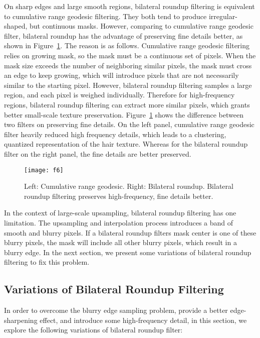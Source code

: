 On sharp edges and large smooth regions, bilateral roundup filtering is equivalent to cumulative range geodesic filtering. They both tend to produce irregular-shaped, but continuous masks. However, comparing to cumulative range geodesic filter, bilateral roundup has the advantage of preserving fine details better, as shown in Figure~\ref{fig:comparisonBetweenTwoFilters}. The reason is as follows. Cumulative range geodesic filtering relies on growing mask, so the mask must be a continuous set of pixels. When the mask size exceeds the number of neighboring similar pixels, the mask must cross an edge to keep growing, which will introduce pixels that are not necessarily similar to the starting pixel. However, bilateral roundup filtering samples a large region, and each pixel is weighed individually. Therefore for high-frequency regions, bilateral roundup filtering can extract more similar pixels, which grants better small-scale texture preservation. Figure~\ref{fig:comparisonBetweenTwoFilters} shows the difference between two filters on preserving fine details. On the left panel, cumulative range geodesic filter heavily reduced high frequency details, which leads to a clustering, quantized representation of the hair texture. Whereas for the bilateral roundup filter on the right panel, the fine details are better preserved.

\begin{figure}[htbp]\centering
\texttt{[image: f6]}
\caption{Left: Cumulative range geodesic. Right: Bilateral roundup. Bilateral roundup filtering preserves high-frequency, fine details better.}
\label{fig:comparisonBetweenTwoFilters}
\end{figure}

In the context of large-scale upsampling, bilateral roundup filtering has one limitation. The upsampling and interpolation process introduces a band of smooth and blurry pixels. If a bilateral roundup filter\textquotesingle s mask center is one of these blurry pixels, the mask will include all other blurry pixels, which result in a blurry edge. In the next section, we present some variations of bilateral roundup filtering to fix this problem.

\subsection{Variations of Bilateral Roundup Filtering}

In order to overcome the blurry edge sampling problem, provide a better edge-sharpening effect, and introduce some high-frequency detail, in this section, we explore the following variations of bilateral roundup filter:

